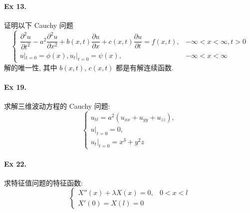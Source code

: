 \paragraph{Ex 13.}
证明以下 Cauchy 问题
\[ \begin{cases}
\dfrac{\partial^2 u}{\partial t^2} - a^2 \dfrac{\partial^2 u}{\partial x^2}
 + b(x, t)\dfrac{\partial u}{\partial x} + c(x, t)\dfrac{\partial u}{\partial t}
 = f(x, t), & -\infty < x < \infty, t > 0 \\ 
u|_{t=0} = \phi(x), u_t|_{t=0} = \psi(x), & -\infty < x < \infty
\end{cases} \]
解的唯一性, 其中 $b(x, t)$, $c(x, t)$ 都是有解连续函数.

\paragraph{Ex 19.}
求解三维波动方程的 Cauchy 问题:
\[ \begin{cases}
u_{tt} = a^2 (u_{xx} + u_{yy} + u_{zz}), \\
u|_{t=0} = 0, \\
u_t|_{t=0} = x^3 + y^2 z
\end{cases} \]

\paragraph{Ex 22.}
求特征值问题的特征函数:
\[ \begin{cases}
X''(x) + \lambda X(x) = 0, & 0 < x < l \\
X'(0) = X(l) = 0
\end{cases} \]

